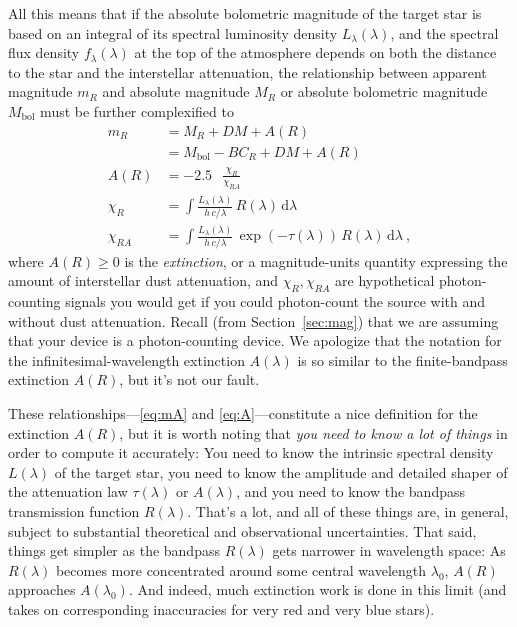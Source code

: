 \documentclass[10pt]{article}
\newcommand{\sectionname}{Section}
\newcommand{\secref}[1]{\sectionname~\ref{#1}}
\newcommand{\dd}{\mathrm{d}}
\newcommand{\bol}{\text{bol}}
\DeclareMathOperator{\logten}{log_{10}}
\begin{document}
All this means that if the absolute bolometric magnitude of the target star is based on an integral of its spectral luminosity density $L_\lambda(\lambda)$, and the spectral flux density $f_\lambda(\lambda)$ at the top of the atmosphere depends on both the distance to the star and the interstellar attenuation, the relationship between apparent magnitude $m_R$ and absolute magnitude $M_R$ or absolute bolometric magnitude $M_\bol$ must be further complexified to
\begin{align}
    m_R &= M_R + DM + A(R)\label{eq:mA}\\
        &= M_\bol - BC_R + DM + A(R)\\
    A(R) &= -2.5\,\logten\frac{\chi_R}{\chi_{RA}}\label{eq:A}\\
    \chi_R &= \int \frac{L_\lambda(\lambda)}{h\,c/\lambda}\,R(\lambda)\,\dd\lambda\\
    \chi_{RA} &= \int \frac{L_\lambda(\lambda)}{h\,c/\lambda}\,\exp(-\tau(\lambda))\,R(\lambda)\,\dd\lambda ~,
    \end{align}
where $A(R)\geq 0$ is the \emph{extinction}, or a magnitude-units quantity expressing the amount of interstellar dust attenuation,
and $\chi_R,\chi_{RA}$ are hypothetical photon-counting signals you would get if you could photon-count the source with and without dust attenuation.
Recall (from \secref{sec:mag}) that we are assuming that your device is a photon-counting device.
We apologize that the notation for the infinitesimal-wavelength extinction $A(\lambda)$ is so similar to the finite-bandpass extinction $A(R)$, but it's not our fault.

These relationships---\eqref{eq:mA} and \eqref{eq:A}---constitute a nice definition for the extinction $A(R)$, but it is worth noting that \emph{you need to know a lot of things} in order to compute it accurately:
You need to know the intrinsic spectral density $L(\lambda)$ of the target star, you need to know the amplitude and detailed shaper of the attenuation law $\tau(\lambda)$ or $A(\lambda)$, and you need to know the bandpass transmission function $R(\lambda)$.
That's a lot, and all of these things are, in general, subject to substantial theoretical and observational uncertainties.
That said, things get simpler as the bandpass $R(\lambda)$ gets narrower in wavelength space:
As $R(\lambda)$ becomes more concentrated around some central wavelength $\lambda_0$, $A(R)$ approaches $A(\lambda_0)$.
And indeed, much extinction work is done in this limit (and takes on corresponding inaccuracies for very red and very blue stars).
\end{document}
